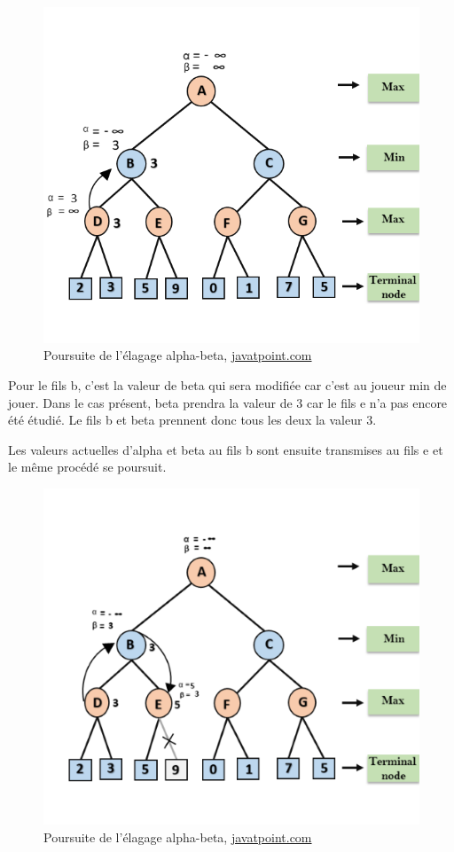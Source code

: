 \huge\documentclass{article}
\begin{document}
    \begin{figure}[h]
        \centering
        \includegraphics[scale=0.6]{img/alpha-beta-pruning-step3.png}
        \caption{Poursuite de l'élagage alpha-beta,
            \href{https://www.javatpoint.com/ai-alpha-beta-pruning}{javatpoint.com}}
    \end{figure}

    Pour le fils b, c'est la valeur de beta qui sera modifiée car c'est au joueur min de jouer. Dans le cas présent, beta prendra la valeur de 3 car le fils e n'a pas encore été étudié. Le fils b et beta prennent donc tous les deux la valeur 3.

    Les valeurs actuelles d'alpha et beta au fils b sont ensuite transmises au fils e et le même procédé se poursuit.

    \begin{figure}[h]
        \centering
        \includegraphics[scale=0.7]{img/alpha-beta-pruning-step4.png}
        \caption{Poursuite de l'élagage alpha-beta,
            \href{https://www.javatpoint.com/ai-alpha-beta-pruning}{javatpoint.com}}
    \end{figure}
\end{document}
